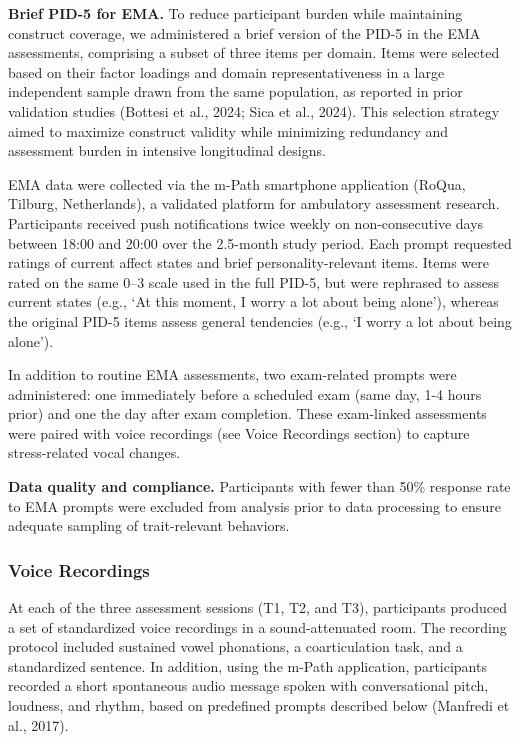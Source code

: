 \documentclass[
  english,
  man]{apa6}
\begin{document}
\textbf{Brief PID-5 for EMA.} To reduce participant burden while maintaining construct coverage, we administered a brief version of the PID-5 in the EMA assessments, comprising a subset of three items per domain. Items were selected based on their factor loadings and domain representativeness in a large independent sample drawn from the same population, as reported in prior validation studies (Bottesi et al., 2024; Sica et al., 2024). This selection strategy aimed to maximize construct validity while minimizing redundancy and assessment burden in intensive longitudinal designs.

EMA data were collected via the m-Path smartphone application (RoQua, Tilburg, Netherlands), a validated platform for ambulatory assessment research. Participants received push notifications twice weekly on non-consecutive days between 18:00 and 20:00 over the 2.5-month study period. Each prompt requested ratings of current affect states and brief personality-relevant items. Items were rated on the same 0--3 scale used in the full PID-5, but were rephrased to assess current states (e.g., `At this moment, I worry a lot about being alone'), whereas the original PID-5 items assess general tendencies (e.g., `I worry a lot about being alone').

In addition to routine EMA assessments, two exam-related prompts were administered: one immediately before a scheduled exam (same day, 1-4 hours prior) and one the day after exam completion. These exam-linked assessments were paired with voice recordings (see Voice Recordings section) to capture stress-related vocal changes.

\textbf{Data quality and compliance.} Participants with fewer than 50\% response rate to EMA prompts were excluded from analysis prior to data processing to ensure adequate sampling of trait-relevant behaviors.

\subsubsection{Voice Recordings}\label{voice-recordings}

At each of the three assessment sessions (T1, T2, and T3), participants produced a set of standardized voice recordings in a sound-attenuated room. The recording protocol included sustained vowel phonations, a coarticulation task, and a standardized sentence. In addition, using the m-Path application, participants recorded a short spontaneous audio message spoken with conversational pitch, loudness, and rhythm, based on predefined prompts described below (Manfredi et al., 2017).
\end{document}
